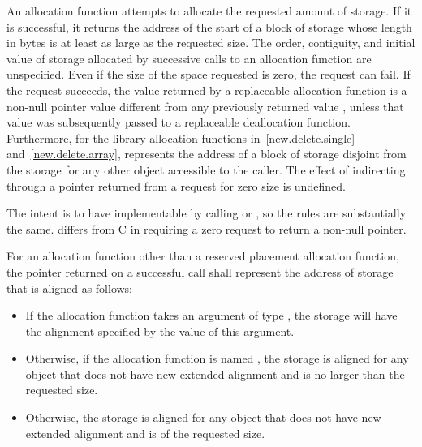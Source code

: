 \pnum
An allocation function attempts to allocate the requested amount of
storage. If it is successful, it returns the address of the start
of a block of storage whose length in bytes is at least as large
as the requested size.
The order,
contiguity, and initial value of storage allocated by successive calls
to an allocation function are unspecified.
Even if the size of the space
requested is zero, the request can fail. If the request succeeds, the
value returned by a replaceable allocation function
is a non-null pointer value
 different from any previously returned value ,
unless that value  was subsequently passed to a
replaceable deallocation function.
Furthermore, for the library allocation functions
in~\ref{new.delete.single} and~\ref{new.delete.array},
 represents the address of a block of storage disjoint from the storage
for any other object accessible to the caller.
The effect of indirecting through a pointer
returned from a request for zero size is undefined.
%
%
%
%
%
\begin{footnote}
The intent is
to have  implementable by
calling  or , so the rules are
substantially the same. \Cpp{} differs from C in requiring a zero request
to return a non-null pointer.
\end{footnote}

\pnum
For an allocation function other than
a reserved placement allocation function,
the pointer returned on a successful call
shall represent the address of storage that is aligned as follows:
\begin{itemize}
\item
  If the allocation function takes an argument
  of type ,
  the storage will have the alignment specified
  by the value of this argument.
\item
  Otherwise, if the allocation function is named ,
  the storage is aligned for any object that
  does not have new-extended alignment and
  is no larger than the requested size.
\item
  Otherwise, the storage is aligned for any object that
  does not have new-extended alignment and is of the requested size.
\end{itemize}

